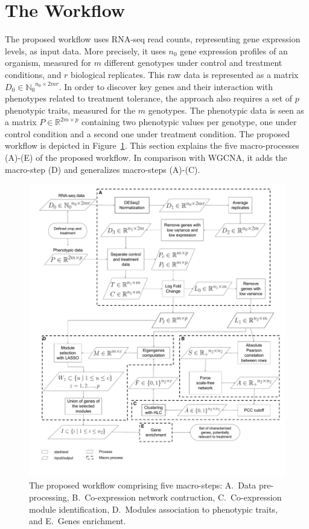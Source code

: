 \section{The Workflow}
\label{sec.framework}

The proposed workflow uses RNA-seq read counts, representing gene
expression levels, as input data. More precisely, it uses $n_0$ gene
expression profiles of an organism, measured for $m$ different
genotypes under control and treatment conditions, and $r$ biological
replicates. This raw data is represented as a matrix $D_0 \in
{\mathbb{N}_0}^{n_0 \times 2mr}$. In order to discover key genes and
their interaction with phenotypes related to treatment tolerance, the
approach also requires a set of $p$ phenotypic traits, measured for
the $m$ genotypes. The phenotypic data is seen as a matrix $P \in
\mathbb{R}^{2m \times p}$ containing two phenotypic values per
genotype, one under control condition and a second one under treatment
condition. The proposed workflow is depicted in
Figure~\ref{fig:flow_chart}. This section explains the five
macro-processes (A)-(E) of the proposed workflow. In comparison with
WGCNA, it adds the macro-step (D) and generalizes macro-steps (A)-(C).

\begin{figure}[htpb]
  \centering
    \includegraphics[clip,width=1\textwidth]{figures/flow_chart_2.pdf}
  \caption{The proposed workflow comprising five macro-steps:
    A.~Data pre-processing, B.~Co-expression network
    contruction, C.~Co-expression module identification,
    D.~Modules association to phenotypic traits, and
    E.~Genes enrichment.}
  \label{fig:flow_chart}
\end{figure}

